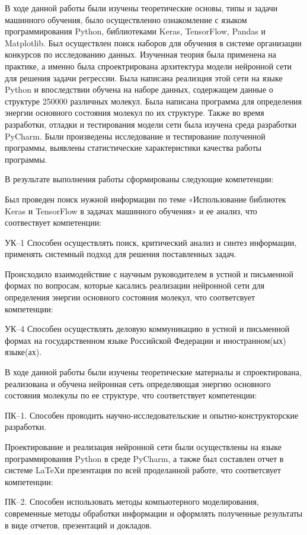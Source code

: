 \conclusion
В ходе данной работы были изучены теоретические основы, типы и задачи машинного обучения, было осуществленно ознакомление с языком программирования Python, библиотеками Keras, TensorFlow, Pandas и Matplotlib. Был осуществлен поиск наборов для обучения в системе организации конкурсов по исследованию данных. Изученная теория была применена на практике, а именно была спроектрирована архитектура модели нейронной сети для решения задачи регрессии. Была написана реализция этой сети на языке Python и впоследствии обучена на наборе данных, содержащем данные о структуре 250000 различных молекул. Была написана программа для определения энергии основного состояния молекул по их структуре. Также во время разработки, отладки и тестирования модели сети была изучена среда разработки PyCharm. Были произведены исследование и тестирование полученной программы, выявлены статистические характеристики качества работы программы. 

В результате выполнения работы сформированы следующие компетенции:

Был проведен поиск нужной информации по теме «Использование библиотек Keras и TensorFlow в задачах машинного обучения» и ее анализ, что соотвествует компетенции:

УК--1 Способен осуществлять поиск, критический анализ и синтез информации, применять системный подход для решения поставленных задач.

Происходило взаимодействие с научным руководителем в устной и письменной формах по вопросам, которые касались реализации нейронной сети для определения энергии основного состояния молекул, что соответсвует компетенции:

УК--4 Способен осуществлять деловую коммуникацию в устной и письменной формах на государственном языке Российской Федерации и иностранном(ых) языке(ах).

В ходе данной работы были изучены теоретические материалы и спроектирована, реализована и обучена нейронная сеть определяющая энергию основного состояния молекулы по ее структуре, что соответствует компетенции:

ПК--1. Способен проводить научно-исследовательские и опытно-конструкторские разработки.

Проектирование и реализация нейронной сети были осуществлены на языке программирования Python в среде PyCharm, а также был составлен отчет в системе \LaTeX и презентация по всей проделанной работе, что соответсвует компетенции: 

ПК--2. Способен использовать методы компьютерного моделирования, современные методы обработки информации и оформлять полученные результаты в виде отчетов, презентаций и докладов.